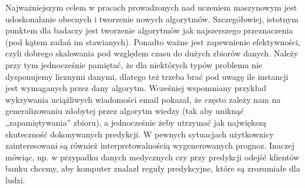 \documentclass[12pt,a4paper,twoside,openany]{book}
\begin{document}
Najważniejszym celem w pracach prowadzonych nad uczeniem maszynowym jest udoskonalanie obecnych i tworzenie nowych algorytmów. Szczegółowiej, istotnym punktem dla badaczy jest tworzenie algorytmów jak najszerszego przeznaczenia (pod kątem zadań im stawianych). Ponadto ważne jest zapewnienie efektywności, czyli dobrego skalowania pod względem czasu do dużych zbiorów danych. Należy przy tym jednocześnie pamiętać, że dla niektórych typów problemu nie dysponujemy licznymi danymi, dlatego też trzeba brać pod uwagę ile instancji jest wymaganych przez dany algorytm. Wcześniej wspomniany przykład wykrywania uciążliwych wiadomości email pokazał, że często zależy nam na generalizowaniu zdobytej przez algorytm wiedzy (tak aby uniknąć „zapamiętywania” zbioru), a jednocześnie żeby utrzymać jak największą skuteczność dokonywanych predykcji. W pewnych sytuacjach użytkownicy zainteresowani są również interpretowalnością wygenerowanych prognoz. Inaczej mówiąc, np. w przypadku danych medycznych czy przy predykcji odejść klientów banku chcemy, aby komputer znalazł reguły predykcyjne, które są zrozumiałe dla ludzi. 
\end{document}
